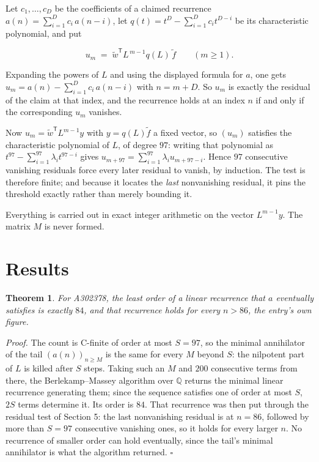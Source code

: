 \documentclass[11pt]{article}
\newtheorem{theorem}{Theorem}
\theoremstyle{definition}
\begin{document}
Let $c_1,\dots,c_D$ be the coefficients of a claimed recurrence $a(n) = \sum_{i=1}^{D} c_i\,a(n-i)$, let $q(t) = t^{D} - \sum_{i=1}^{D} c_i t^{D-i}$ be its characteristic polynomial, and put

\[u_m \;=\; \tilde w^{\mathsf T} L^{\,m-1} q(L)\,\tilde f \qquad (m \ge 1).\]

Expanding the powers of $L$ and using the displayed formula for $a$, one gets $u_m = a(n) - \sum_{i=1}^{D} c_i\,a(n-i)$ with $n = m + D$. So $u_m$ is exactly the residual of the claim at that index, and the recurrence holds at an index $n$ if and only if the corresponding $u_m$ vanishes.

Now $u_m = \tilde w^{\mathsf T} L^{m-1} y$ with $y = q(L)\tilde f$ a fixed vector, so $(u_m)$ satisfies the characteristic polynomial of $L$, of degree $97$: writing that polynomial as $t^{97} - \sum_{i=1}^{97} \lambda_i t^{97-i}$ gives $u_{m+97} = \sum_{i=1}^{97} \lambda_i u_{m+97-i}$. Hence $97$ consecutive vanishing residuals force every later residual to vanish, by induction. The test is therefore finite; and because it locates the {\itshape last} nonvanishing residual, it pins the threshold exactly rather than merely bounding it.

Everything is carried out in exact integer arithmetic on the vector $L^{m-1}y$. The matrix $M$ is never formed.

\section{Results}

\begin{theorem} For A302378, the least order of a linear recurrence that $a$ eventually satisfies is exactly $84$, and that recurrence holds for every $n > 86$, the entry's own figure.\end{theorem}

{\itshape Proof.} The count is C-finite of order at most $S = 97$, so the minimal annihilator of the tail $(a(n))_{n \ge M}$ is the same for every $M$ beyond $S$: the nilpotent part of $L$ is killed after $S$ steps. Taking such an $M$ and $200$ consecutive terms from there, the Berlekamp--Massey algorithm over $\mathbb{Q}$ returns the minimal linear recurrence generating them; since the sequence satisfies one of order at most $S$, $2S$ terms determine it. Its order is $84$. That recurrence was then put through the residual test of Section 5: the last nonvanishing residual is at $n = 86$, followed by more than $S = 97$ consecutive vanishing ones, so it holds for every larger $n$. No recurrence of smaller order can hold eventually, since the tail's minimal annihilator is what the algorithm returned. $\square$
\end{document}
